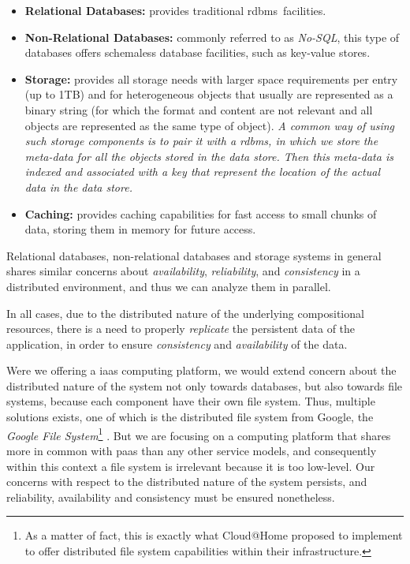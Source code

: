 \documentclass[12pt, titlepage]{uo_temp}
\begin{document}
     \begin{itemize}
       \item \textbf{Relational Databases:} provides traditional \gls{rdbms}\ facilities.
       \item \textbf{Non-Relational Databases:} commonly referred to as \emph{No-SQL}, this
         type of databases offers schemaless database facilities, such as key-value stores. 
       \item \textbf{Storage:} provides all storage needs with larger space requirements
         per entry (up to 1TB) and for heterogeneous objects that usually are represented
         as a binary string (for which the format and content are not relevant and all
         objects are represented as the same type of object). \emph{A common way of using such
         storage components is to pair it with a \gls{rdbms}, in which we store the
         meta-data for all the objects stored in the data store. Then this meta-data is
         indexed and associated with a key that represent the location of the actual data
         in the data store.}
       \item \textbf{Caching:} provides caching capabilities for fast access to small
         chunks of data, storing them in memory for future access.
     \end{itemize}
     
     Relational databases, non-relational databases and storage systems in general shares
     similar concerns about \emph{availability}, \emph{reliability}, and
     \emph{consistency} in a distributed environment, and thus we can analyze them in
     parallel.

     In all cases, due to the distributed nature of the underlying compositional
     resources, there is a need to properly \emph{replicate} the persistent data of the
     application, in order to ensure \emph{consistency} and \emph{availability} of the
     data.
     
     Were we offering a \gls{iaas} computing platform, we would extend concern about the
     distributed nature of the system not only towards databases, but also towards file
     systems, because each component have their own file system. Thus, multiple solutions
     exists, one of which is the distributed file system from Google, the \emph{Google
       File System}\footnote{As a matter of fact, this is exactly what Cloud@Home proposed
       to implement to offer distributed file system capabilities within their
       infrastructure.} \cite{gfs}. But we are focusing on a computing platform that
     shares more in common with \gls{paas} than any other service models, and consequently
     within this context a file system is irrelevant because it is too low-level. Our
     concerns with respect to the distributed nature of the system persists, and
     reliability, availability and consistency must be ensured nonetheless.
     
\end{document}
